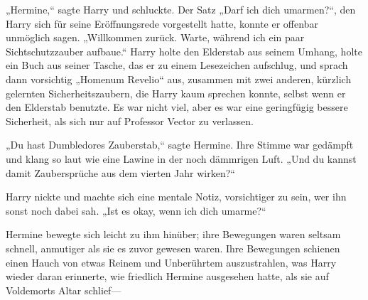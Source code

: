 „Hermine,“ sagte Harry und schluckte. Der Satz „Darf ich dich umarmen?“, den Harry sich für seine Eröffnungsrede vorgestellt hatte, konnte er offenbar unmöglich sagen. „Willkommen zurück. Warte, während ich ein paar Sichtschutzzauber aufbaue.“
Harry holte den Elderstab aus seinem Umhang, holte ein Buch aus seiner Tasche, das er zu einem Lesezeichen aufschlug, und sprach dann vorsichtig „Homenum Revelio“ aus, zusammen mit zwei anderen, kürzlich gelernten Sicherheitszaubern, die Harry kaum sprechen konnte, selbst wenn er den Elderstab benutzte. Es war nicht viel, aber es war eine geringfügig bessere Sicherheit, als sich nur auf Professor Vector zu verlassen.

„Du hast Dumbledores Zauberstab,“ sagte Hermine. Ihre Stimme war gedämpft und klang so laut wie eine Lawine in der noch dämmrigen Luft. „Und du kannst damit Zaubersprüche aus dem vierten Jahr wirken?“

Harry nickte und machte sich eine mentale Notiz, vorsichtiger zu sein, wer ihn sonst noch dabei sah.
„Ist es okay, wenn ich dich umarme?“

Hermine bewegte sich leicht zu ihm hinüber; ihre Bewegungen waren seltsam schnell, anmutiger als sie es zuvor gewesen waren. Ihre Bewegungen schienen einen Hauch von etwas Reinem und Unberührtem auszustrahlen, was Harry wieder daran erinnerte, wie friedlich Hermine ausgesehen hatte, als sie auf Voldemorts Altar schlief—

